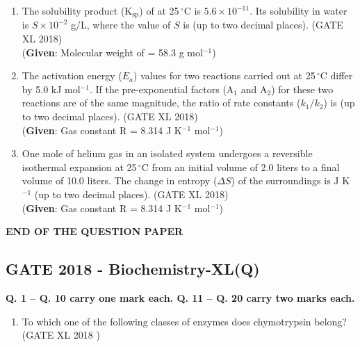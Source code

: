 \documentclass[14pt]{extarticle}
\begin{document}
\begin{flushleft}
\begin{enumerate}
\item The solubility product (K$_\mathrm{sp}$) of  at 25\,$^\circ$C is $5.6 \times 10^{-11}$. Its solubility in water is $S \times 10^{-2}$ g/L, where the value of $S$ is \underline{\hspace{3cm}} (up to two decimal places). \hfill (GATE XL 2018)\\
(\textbf{Given}: Molecular weight of  = 58.3 g mol$^{-1}$)

\item The activation energy ($E_a$) values for two reactions carried out at 25\,$^\circ$C differ by 5.0 kJ mol$^{-1}$. If the pre-exponential factors (A$_1$ and A$_2$) for these two reactions are of the same magnitude, the ratio of rate constants ($k_1/k_2$) is \underline{\hspace{3cm}} (up to two decimal places). \hfill (GATE XL 2018)\\
(\textbf{Given}: Gas constant R = 8.314 J K$^{-1}$ mol$^{-1}$)

\item One mole of helium gas in an isolated system undergoes a reversible isothermal expansion at 25\,$^\circ$C from an initial volume of 2.0 liters to a final volume of 10.0 liters. The change in entropy ($\Delta S$) of the surroundings is \underline{\hspace{3cm}} J K$^{-1}$ (up to two decimal places). \hfill (GATE XL 2018)\\
(\textbf{Given}: Gas constant R = 8.314 J K$^{-1}$ mol$^{-1}$)

\end{enumerate}
\begin{center}
    \textbf{END OF THE QUESTION PAPER}
\end{center}
\clearpage

\begin{center}
    
\section*{GATE 2018 - Biochemistry-XL(Q)}
\noindent\textbf{Q. 1 -- Q. 10 carry one mark each. Q. 11 -- Q. 20 carry two marks each.}
\end{center}
\begin{enumerate}[leftmargin=*]

\item To which one of the following classes of enzymes does chymotrypsin belong?\\
\hfill(GATE XL 2018 )\\
\begin{enumerate}
\end{enumerate} 


\end{enumerate}
\end{flushleft}
\end{document}
